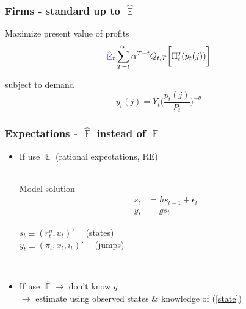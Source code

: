 \documentclass[11pt]{beamer}
\DeclareMathOperator{\E}{\mathbb{E}}
\begin{document}
\begin{frame}
	\frametitle{Firms - standard up to $\hat{\E}$}

Maximize present value of profits
\begin{equation}
\textcolor{blue}{\hat{\E}_t}\sum^{\infty}_{T=t}\alpha^{T-t} Q_{t,T} \bigg[ \Pi^j_t(p_t(j))\bigg]
\label{lifetime_profits}
\end{equation}

subject to demand
\begin{equation}
y_t(j) = Y_t \bigg(\frac{p_t(j)}{P_t}\bigg)^{-\theta}
\end{equation}


\vfill

\hyperlink{details_HHs_firms}{}

\end{frame}

\begin{frame}
	\frametitle{Expectations - $\hat{\E}$ instead of $\E$}

\begin{itemize}
\item If use $\E$ (rational expectations, RE) \\

\

Model solution 
 \begin{align}
 s_t & = h s_{t-1} + \epsilon_t \label{state} \\
 y_t & = g s_t \label{obs_RE}
 \end{align}


$s_t \equiv (r^n_t, u_t)' \quad $  (states) \\
$y_t \equiv (\pi_t, x_t, i_t)' \quad $ (jumps)

\

\item If use $\hat{\E} \rightarrow$ don't know $g$ \\
$\rightarrow$ estimate using observed states \& knowledge of (\ref{state})
\end{itemize}



\end{frame}
\end{document}
